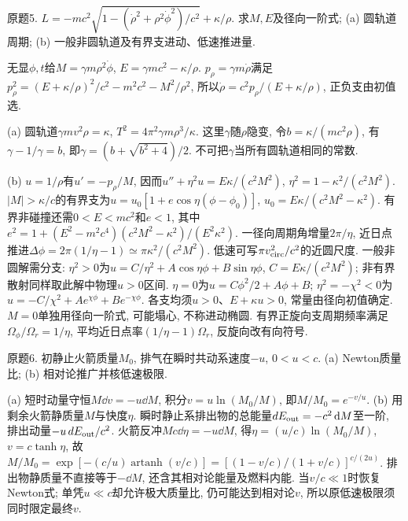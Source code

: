 \begin{exercise}
原题5. $L=-mc^2\sqrt{1-(\dot\rho^2+\rho^2\dot\phi^2)/c^2}+\kappa/\rho$. 求$M,E$及径向一阶式; (a) 圆轨道周期; (b) 一般非圆轨道及有界支进动、低速推进量.
\end{exercise}
\begin{solution}
无显$\phi,t$给$M=\gamma m\rho^2\dot\phi$, $E=\gamma mc^2-\kappa/\rho$. $p_\rho=\gamma m\dot\rho$满足$p_\rho^2=(E+\kappa/\rho)^2/c^2-m^2c^2-M^2/\rho^2$, 所以$\dot\rho=c^2p_\rho/(E+\kappa/\rho)$, 正负支由初值选.

(a) 圆轨道$\gamma mv^2\rho=\kappa$, $T^2=4\pi^2\gamma m\rho^3/\kappa$. 这里$\gamma$随$\rho$隐变, 令$b=\kappa/(mc^2\rho)$, 有$\gamma-1/\gamma=b$, 即$\gamma=(b+\sqrt{b^2+4})/2$. 不可把$\gamma$当所有圆轨道相同的常数.

(b) $u=1/\rho$有$u'=-p_\rho/M$, 因而$u''+\eta^2u=E\kappa/(c^2M^2)$, $\eta^2=1-\kappa^2/(c^2M^2)$. $|M|>\kappa/c$的有界支为$u=u_0[1+e\cos\eta(\phi-\phi_0)]$, $u_0=E\kappa/(c^2M^2-\kappa^2)$. 有界非碰撞还需$0<E<mc^2$和$e<1$, 其中$e^2=1+(E^2-m^2c^4)(c^2M^2-\kappa^2)/(E^2\kappa^2)$. 一径向周期角增量$2\pi/\eta$, 近日点推进$\Delta\phi=2\pi(1/\eta-1)\simeq\pi\kappa^2/(c^2M^2)$. 低速可写$\pi v_{\rm circ}^2/c^2$的近圆尺度. 一般非圆解需分支: $\eta^2>0$为$u=C/\eta^2+A\cos\eta\phi+B\sin\eta\phi$, $C=E\kappa/(c^2M^2)$; 非有界散射同样取此解中物理$u>0$区间. $\eta=0$为$u=C\phi^2/2+A\phi+B$; $\eta^2=-\chi^2<0$为$u=-C/\chi^2+Ae^{\chi\phi}+Be^{-\chi\phi}$. 各支均须$u>0$、$E+\kappa u>0$, 常量由径向初值确定. $M=0$单独用径向一阶式, 可能塌心, 不称进动椭圆. 有界正旋向支周期频率满足$\Omega_\phi/\Omega_r=1/\eta$, 平均近日点率$(1/\eta-1)\Omega_r$, 反旋向改有向符号.
\end{solution}
\begin{exercise}
原题6. 初静止火箭质量$M_0$, 排气在瞬时共动系速度$-u$, $0<u<c$. (a) Newton质量比; (b) 相对论推广并核低速极限.
\end{exercise}
\begin{solution}
(a) 短时动量守恒$M\dd v=-u\dd M$, 积分$v=u\ln(M_0/M)$, 即$M/M_0=e^{-v/u}$. (b) 用剩余火箭静质量$M$与快度$\eta$. 瞬时静止系排出物的总能量$dE_{\rm out}=-c^2\,\mathrm d M$至一阶, 排出动量$-u\,dE_{\rm out}/c^2$. 火箭反冲$Mc\dd\eta=-u\dd M$, 得$\eta=(u/c)\ln(M_0/M)$, $v=c\tanh\eta$, 故
$M/M_0=\exp[-(c/u)\operatorname{artanh}(v/c)]=[(1-v/c)/(1+v/c)]^{c/(2u)}$.
排出物静质量不直接等于$-\dd M$, 还含其相对论能量及燃料内能. 当$v/c\ll1$时恢复Newton式; 单凭$u\ll c$却允许极大质量比, 仍可能达到相对论$v$, 所以原低速极限须同时限定最终$v$.
\end{solution}
